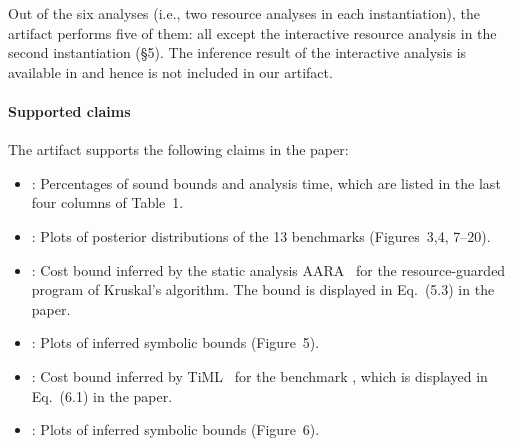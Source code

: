 Out of the six analyses (i.e., two resource analyses in each instantiation), the
artifact performs five of them: all except the interactive resource analysis in
the second instantiation (\S5).
%
The inference result of the interactive analysis is available in
\citet{Chargueraud2019} and hence is not included in our artifact.

\paragraph{Supported claims}

The artifact supports the following claims in the paper:
\begin{itemize}
  \item {}: Percentages of sound bounds
        and analysis time, which are listed in the last four columns of Table~1.
  \item {}: Plots of posterior
        distributions of the 13 benchmarks (Figures~3,4, 7--20).
  \item {}: Cost bound inferred by the
        static analysis AARA~\citep{Hofmann2003,Hoffmann2011a,Hoffmann2022} for
        the resource-guarded program of Kruskal's algorithm.
        The bound is displayed in Eq.~(5.3) in the paper.
  \item {}: Plots of inferred symbolic
        bounds (Figure~5).
  \item {}: Cost bound inferred by
        TiML~\citep{WangWC17} for the benchmark \quicksorttiml{}, which is
        displayed in Eq.~(6.1) in the paper.
  \item {}: Plots of inferred symbolic
        bounds (Figure~6).
\end{itemize}
